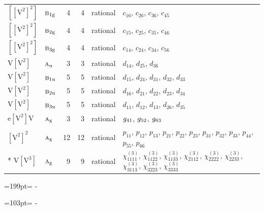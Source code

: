 \documentclass[10pt,a4paper]{article}
\newcommand{\needspace}[1]{\par\penalty-100\begingroup\dimen0=#1\relax\dimen2=\pagegoal
  \advance\dimen2-\pagetotal\ifdim\dimen0>\dimen2\relax\ifdim\dimen2>0pt\vfil\break\fi\fi
  \endgroup}
\numberwithin{equation}{section}
\newcommand{\irr}[1]{\text{\normalfont\scshape #1}}
\newcommand{\ptag}[1]{\mathrm{#1}}
\newcommand{\jahn}[1]{\mathrm{#1}}
\newlength{\fillwidth}\newlength{\cellwidth}\newlength{\colwidth}
\begin{document}
{\begin{longtable}{@{}llrrl>{\RaggedRight\arraybackslash}p{\fillwidth}@{}}
$\jahn{[[V^{2}]^{2}]}$ & $\irr{b}_{1\ptag{g}}$ & 4 & 4 & rational & $c_{16}$, $c_{26}$, $c_{36}$, $c_{45}$\\
$\jahn{[[V^{2}]^{2}]}$ & $\irr{b}_{2\ptag{g}}$ & 4 & 4 & rational & $c_{15}$, $c_{25}$, $c_{35}$, $c_{46}$\\
$\jahn{[[V^{2}]^{2}]}$ & $\irr{b}_{3\ptag{g}}$ & 4 & 4 & rational & $c_{14}$, $c_{24}$, $c_{34}$, $c_{56}$\\
$\jahn{V[V^{2}]}$ & $\irr{a}_{\ptag{u}}$ & 3 & 3 & rational & $d_{14}$, $d_{25}$, $d_{36}$\\
$\jahn{V[V^{2}]}$ & $\irr{b}_{1\ptag{u}}$ & 5 & 5 & rational & $d_{15}$, $d_{24}$, $d_{31}$, $d_{32}$, $d_{33}$\\
$\jahn{V[V^{2}]}$ & $\irr{b}_{2\ptag{u}}$ & 5 & 5 & rational & $d_{16}$, $d_{21}$, $d_{22}$, $d_{23}$, $d_{34}$\\
$\jahn{V[V^{2}]}$ & $\irr{b}_{3\ptag{u}}$ & 5 & 5 & rational & $d_{11}$, $d_{12}$, $d_{13}$, $d_{26}$, $d_{35}$\\
$\jahn{e[V^{2}]V}$ & $\irr{a}_{\ptag{g}}$ & 3 & 3 & rational & $\mathnormal{g}_{41}$, $\mathnormal{g}_{52}$, $\mathnormal{g}_{63}$\\
$\jahn{[V^{2}]^{2}}$ & $\irr{a}_{\ptag{g}}$ & 12 & 12 & rational & $p_{11}$, $p_{12}$, $p_{13}$, $p_{21}$, $p_{22}$, $p_{23}$, $p_{31}$, $p_{32}$, $p_{33}$, $p_{44}$, $p_{55}$, $p_{66}$\\*
$\jahn{V[V^{3}]}$ & $\irr{a}_{\ptag{g}}$ & 9 & 9 & rational & $\chi^{(3)}_{1111}$, $\chi^{(3)}_{1122}$, $\chi^{(3)}_{1133}$, $\chi^{(3)}_{2112}$, $\chi^{(3)}_{2222}$, $\chi^{(3)}_{2233}$, $\chi^{(3)}_{3113}$, $\chi^{(3)}_{3223}$, $\chi^{(3)}_{3333}$\\
\bottomrule\end{longtable}}
\needspace{199pt}
\needspace{103pt}
\end{document}
